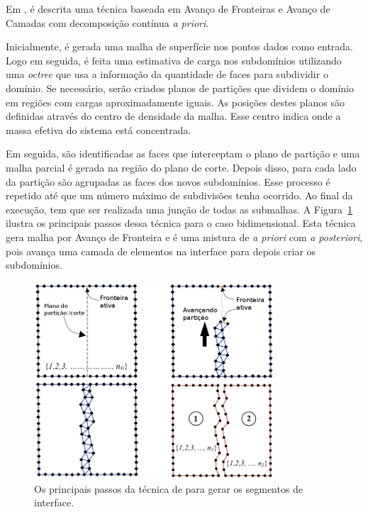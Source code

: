 Em \cite{bib:Pirzadeh09}, é descrita uma técnica baseada em Avanço de Fronteiras e Avanço de Camadas com decomposição contínua \textit{a priori}.

Inicialmente, é gerada uma malha de superfície nos pontos dados como entrada. Logo em seguida, é feita uma estimativa de carga nos subdomínios utilizando uma \textit{octree} que usa a informação da quantidade de faces para subdividir o domínio. Se necessário, serão criados planos de partições que dividem o domínio em regiões com cargas aproximadamente iguais. As posições destes planos são definidas através do centro de densidade da malha. Esse centro indica onde a massa efetiva do sistema está concentrada.

Em seguida, são identificadas as faces que interceptam o plano de partição e uma malha parcial é gerada na região do plano de corte. Depois disso, para cada lado da partição são agrupadas as faces dos novos subdomínios. Esse processo é repetido até que um número máximo de subdivisões tenha ocorrido. Ao final da execução, tem que ser realizada uma junção de todas as submalhas. A Figura~\ref{fig:pirzadeh09} ilustra os principais passos dessa técnica para o caso bidimensional. Esta técnica gera malha por Avanço de Fronteira e é uma mistura de \textit{a priori} com \textit{a posteriori}, pois avança uma camada de elementos na interface para depois criar os subdomínios.

 \begin{figure}[htbp]
     \centering
     \includegraphics[width=0.8\textwidth]{fig/pirzadeh09.jpg}
     \caption{Os principais passos da técnica de \cite{bib:Pirzadeh09} para gerar os segmentos de interface.}
     \label{fig:pirzadeh09}
 \end{figure}
 
